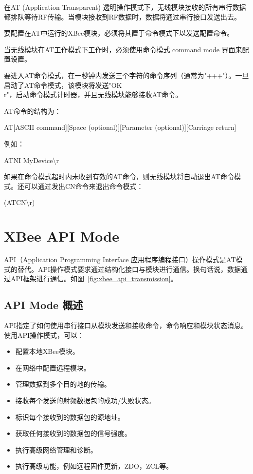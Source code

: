 在AT (Application Transparent) 透明操作模式下，无线模块接收的所有串行数据都排队等待RF传输。当模块接收到RF数据时，数据将通过串行接口发送出去。

要配置在AT中运行的XBee模块，必须将其置于命令模式下以发送配置命令。

当无线模块在AT工作模式下工作时，必须使用命令模式 command mode 界面来配置设置。

要进入AT命令模式，在一秒钟内发送三个字符的命令序列（通常为"+++"）。一旦启动了AT命令模式，该模块将发送"OK \\ r"，启动命令模式计时器，并且无线模块能够接收AT命令。

AT命令的结构为：

\begin{tcolorbox}
    AT[ASCII command][Space (optional)][Parameter (optional)][Carriage return]
\end{tcolorbox}

例如：

\begin{tcolorbox}
    ATNI MyDevice\textbackslash{}r
\end{tcolorbox}

如果在命令模式超时内未收到有效的AT命令，则无线模块将自动退出AT命令模式。还可以通过发出CN命令来退出命令模式：

\begin{tcolorbox}
    (ATCN\textbackslash{}r)
\end{tcolorbox}

\section{XBee API Mode}

API（Application Programming Interface 应用程序编程接口）操作模式是AT模式的替代。API操作模式要求通过结构化接口与模块进行通信。换句话说，数据通过API框架进行通信。如图~\ref{fig:xbee_api_transmission}。

\subsection{API Mode 概述}

API指定了如何使用串行接口从模块发送和接收命令，命令响应和模块状态消息。使用API​​操作模式，可以：

\begin{itemize}
    \item 配置本地XBee模块。
    \item 在网络中配置远程模块。
    \item 管理数据到多个目的地的传输。
    \item 接收每个发送的射频数据包的成功/失败状态。
    \item 标识每个接收到的数据包的源地址。
    \item 获取任何接收到的数据包的信号强度。
    \item 执行高级网络管理和诊断。
    \item 执行高级功能，例如远程固件更新，ZDO，ZCL等。
\end{itemize}

